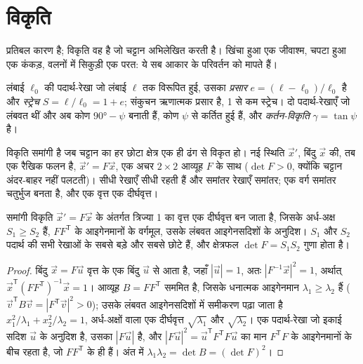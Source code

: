 \section{विकृति}\label{sec:b1:stress-strain-rheology:strain}

प्रतिबल कारण है; विकृति वह है जो चट्टान अभिलेखित करती है। खिंचा हुआ एक जीवाश्म, चपटा हुआ एक कंकड़, वलनों में सिकुड़ी एक परत: ये सब आकार के परिवर्तन को मापते हैं।

\begin{definition}[प्रसार, स्ट्रेच, कर्तन-विकृति]
\label{def:b1:stress-strain-rheology:strain}
लंबाई $\ell_0$ की पदार्थ-रेखा जो लंबाई $\ell$ तक विरूपित हुई, उसका \emph{प्रसार} $e = (\ell - \ell_0)/\ell_0$ है और \emph{स्ट्रेच} $S = \ell/\ell_0 = 1 + e$; संकुचन ऋणात्मक प्रसार है, 1 से कम स्ट्रेच। दो पदार्थ-रेखाएँ जो लंबवत थीं और अब कोण $\ang{90} - \psi$ बनाती हैं, कोण $\psi$ से कर्तित हुई हैं, और \emph{कर्तन-विकृति} $\gamma = \tan\psi$ है।
\end{definition}

विकृति समांगी है जब चट्टान का हर छोटा क्षेत्र एक ही ढंग से विकृत हो। नई स्थिति $\vec x'$, बिंदु $\vec x$ की, तब एक रैखिक फलन है, $\vec x' = F\vec x$, एक अचर $2\times2$ आव्यूह $F$ के साथ ($\det F > 0$, क्योंकि चट्टान अंदर-बाहर नहीं पलटती)। सीधी रेखाएँ सीधी रहती हैं और समांतर रेखाएँ समांतर; एक वर्ग समांतर चतुर्भुज बनता है, और एक वृत्त एक दीर्घवृत्त।

\begin{proposition}[विकृति-दीर्घवृत्त]
\label{prop:b1:stress-strain-rheology:ellipse}
समांगी विकृति $\vec x' = F\vec x$ के अंतर्गत त्रिज्या 1 का वृत्त एक दीर्घवृत्त बन जाता है, जिसके अर्ध-अक्ष $S_1 \ge S_2$ हैं, $FF^{\mathsf T}$ के आइगेनमानों के वर्गमूल, उसके लंबवत आइगेनसदिशों के अनुदिश। $S_1$ और $S_2$ पदार्थ की सभी रेखाओं के सबसे बड़े और सबसे छोटे  हैं, और क्षेत्रफल $\det F = S_1S_2$ गुणा होता है।
\end{proposition}

\begin{proof}
बिंदु $\vec x = F\vec u$ वृत्त के एक बिंदु $\vec u$ से आता है, जहाँ $|\vec u| = 1$, अतः $|F^{-1}\vec x|^2 = 1$, अर्थात् $\vec x^{\mathsf T}(FF^{\mathsf T})^{-1}\vec x = 1$। आव्यूह $B = FF^{\mathsf T}$ सममित है, जिसके धनात्मक आइगेनमान $\lambda_1 \ge
\lambda_2$ हैं ($\vec v^{\mathsf T}B\vec v = |F^{\mathsf T}\vec v|^2 > 0$); उसके
लंबवत आइगेनसदिशों में समीकरण पढ़ा जाता है
$x_1^2/\lambda_1 + x_2^2/\lambda_2 = 1$, अर्ध-अक्षों वाला एक दीर्घवृत्त
$\sqrt{\lambda_1}$ और $\sqrt{\lambda_2}$। एक पदार्थ-रेखा जो इकाई सदिश $\vec u$ के अनुदिश है, उसका  $|F\vec u|$ है, और $|F\vec u|^2 = \vec u^{\mathsf T}F^{\mathsf T}F\vec u$ का मान $F^{\mathsf T}F$ के आइगेनमानों के बीच रहता है, जो $FF^{\mathsf T}$ के ही हैं। अंत में $\lambda_1\lambda_2 = \det B = (\det F)^2$।
\end{proof}

